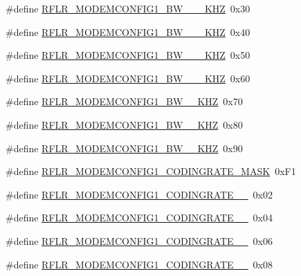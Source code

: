 \begin{DoxyCompactItemize}
\#define \mbox{\hyperlink{sx1276_regs-_lo_ra_8h_a12c825dc67bb4487e8c3844336dfbef0}{R\+F\+L\+R\+\_\+\+M\+O\+D\+E\+M\+C\+O\+N\+F\+I\+G1\+\_\+\+B\+W\+\_\+\_\+\_\+\+K\+HZ}}~0x30
\item 
\#define \mbox{\hyperlink{sx1276_regs-_lo_ra_8h_ac09be492d1d58049e2c5cef4e99607cf}{R\+F\+L\+R\+\_\+\+M\+O\+D\+E\+M\+C\+O\+N\+F\+I\+G1\+\_\+\+B\+W\+\_\+\_\+\_\+\+K\+HZ}}~0x40
\item 
\#define \mbox{\hyperlink{sx1276_regs-_lo_ra_8h_a06e169f2f77974e5f6744d3207878895}{R\+F\+L\+R\+\_\+\+M\+O\+D\+E\+M\+C\+O\+N\+F\+I\+G1\+\_\+\+B\+W\+\_\+\_\+\_\+\+K\+HZ}}~0x50
\item 
\#define \mbox{\hyperlink{sx1276_regs-_lo_ra_8h_a6fa8fd52b3b97c984c917da3ce089bf4}{R\+F\+L\+R\+\_\+\+M\+O\+D\+E\+M\+C\+O\+N\+F\+I\+G1\+\_\+\+B\+W\+\_\+\_\+\_\+\+K\+HZ}}~0x60
\item 
\#define \mbox{\hyperlink{sx1276_regs-_lo_ra_8h_aa19a521faa54c9c8ced4d57973434b1b}{R\+F\+L\+R\+\_\+\+M\+O\+D\+E\+M\+C\+O\+N\+F\+I\+G1\+\_\+\+B\+W\+\_\+\_\+\+K\+HZ}}~0x70
\item 
\#define \mbox{\hyperlink{sx1276_regs-_lo_ra_8h_ab0f85fb037803d4312f614171ceebb45}{R\+F\+L\+R\+\_\+\+M\+O\+D\+E\+M\+C\+O\+N\+F\+I\+G1\+\_\+\+B\+W\+\_\+\_\+\+K\+HZ}}~0x80
\item 
\#define \mbox{\hyperlink{sx1276_regs-_lo_ra_8h_a9fbb21591b341afa0fce0263570d5a03}{R\+F\+L\+R\+\_\+\+M\+O\+D\+E\+M\+C\+O\+N\+F\+I\+G1\+\_\+\+B\+W\+\_\+\_\+\+K\+HZ}}~0x90
\item 
\#define \mbox{\hyperlink{sx1276_regs-_lo_ra_8h_aeb0ea5fbbb7ec90fca31ca87481597c1}{R\+F\+L\+R\+\_\+\+M\+O\+D\+E\+M\+C\+O\+N\+F\+I\+G1\+\_\+\+C\+O\+D\+I\+N\+G\+R\+A\+T\+E\+\_\+\+M\+A\+SK}}~0x\+F1
\item 
\#define \mbox{\hyperlink{sx1276_regs-_lo_ra_8h_aa7c27ea8d7dbd73e49c8516a1fce494e}{R\+F\+L\+R\+\_\+\+M\+O\+D\+E\+M\+C\+O\+N\+F\+I\+G1\+\_\+\+C\+O\+D\+I\+N\+G\+R\+A\+T\+E\+\_\+\_}}~0x02
\item 
\#define \mbox{\hyperlink{sx1276_regs-_lo_ra_8h_ac6c7a7836d0806b3c807f4e13a72d474}{R\+F\+L\+R\+\_\+\+M\+O\+D\+E\+M\+C\+O\+N\+F\+I\+G1\+\_\+\+C\+O\+D\+I\+N\+G\+R\+A\+T\+E\+\_\+\_}}~0x04
\item 
\#define \mbox{\hyperlink{sx1276_regs-_lo_ra_8h_abb6c4f6b2967084666cb7f4a3afdbfc0}{R\+F\+L\+R\+\_\+\+M\+O\+D\+E\+M\+C\+O\+N\+F\+I\+G1\+\_\+\+C\+O\+D\+I\+N\+G\+R\+A\+T\+E\+\_\+\_}}~0x06
\item 
\#define \mbox{\hyperlink{sx1276_regs-_lo_ra_8h_a48839c3cc11bc39faef3b944b148e5c4}{R\+F\+L\+R\+\_\+\+M\+O\+D\+E\+M\+C\+O\+N\+F\+I\+G1\+\_\+\+C\+O\+D\+I\+N\+G\+R\+A\+T\+E\+\_\+\_}}~0x08

\end{DoxyCompactItemize}
